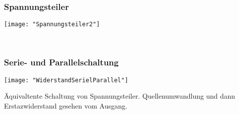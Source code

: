 \subsubsection{Spannungsteiler}
\begin{minipage}[t]{0.1\textwidth}
	\vspace{0pt}
	\texttt{[image: "Spannungsteiler2"]}
\end{minipage}\hspace{0.05\textwidth}
\begin{minipage}[t]{0.4\textwidth}
	\vspace{0pt}
\end{minipage}\hspace{0.05\textwidth}
\begin{minipage}[t]{0.4\textwidth}
	\\
\end{minipage}
\vspace{2mm}


\subsubsection{Serie- und Parallelschaltung}
\begin{minipage}[t]{0.4\textwidth}
	\vspace{0pt}
	\texttt{[image: "WiderstandSerielParallel"]}
\end{minipage}\hspace{0.05\textwidth}
\begin{minipage}[t]{0.55\textwidth}
	\vspace{0pt}
	Äquivaltente Schaltung von Spannungsteiler. Quellenumwandlung und dann Erstazwiderstand gesehen vom Ausgang.
	\\
\end{minipage}\hspace{0.05\textwidth}
\vspace{2mm}

